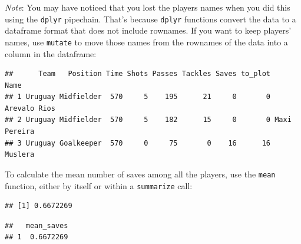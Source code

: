 \documentclass[]{book}
\makeatletter
\newenvironment{Shaded}{\begin{snugshade}}{\end{snugshade}}
\newcommand{\KeywordTok}[1]{\textcolor[rgb]{0.13,0.29,0.53}{\textbf{{#1}}}}
\newcommand{\DataTypeTok}[1]{\textcolor[rgb]{0.13,0.29,0.53}{{#1}}}
\newcommand{\StringTok}[1]{\textcolor[rgb]{0.31,0.60,0.02}{{#1}}}
\newcommand{\NormalTok}[1]{{#1}}
\newenvironment{kframe}{%
\medskip{}
\setlength{\fboxsep}{.8em}
 \def\at@end@of@kframe{}%
 \ifinner\ifhmode%
  \def\at@end@of@kframe{\end{minipage}}%
  \begin{minipage}{\columnwidth}%
 \fi\fi%
 \def\FrameCommand##1{\hskip\@totalleftmargin \hskip-\fboxsep
 \colorbox{shadecolor}{##1}\hskip-\fboxsep
     \hskip-\linewidth \hskip-\@totalleftmargin \hskip\columnwidth}%
 \MakeFramed {\advance\hsize-\width
   \@totalleftmargin\z@ \linewidth\hsize
   \@setminipage}}%
 {\par\unskip\endMakeFramed%
 \at@end@of@kframe}
\renewenvironment{Shaded}{\begin{kframe}}{\end{kframe}}
\makeatother
\begin{document}
\emph{Note}: You may have noticed that you lost the players names when
you did this using the \texttt{dplyr} pipechain. That's because
\texttt{dplyr} functions convert the data to a dataframe format that
does not include rownames. If you want to keep players' names, use
\texttt{mutate} to move those names from the rownames of the data into a
column in the dataframe:

\begin{Shaded}
\end{Shaded}

\begin{verbatim}
##      Team   Position Time Shots Passes Tackles Saves to_plot         Name
## 1 Uruguay Midfielder  570     5    195      21     0       0 Arevalo Rios
## 2 Uruguay Midfielder  570     5    182      15     0       0 Maxi Pereira
## 3 Uruguay Goalkeeper  570     0     75       0    16      16      Muslera
\end{verbatim}

To calculate the mean number of saves among all the players, use the
\texttt{mean} function, either by itself or within a \texttt{summarize}
call:

\begin{Shaded}
\end{Shaded}

\begin{verbatim}
## [1] 0.6672269
\end{verbatim}

\begin{Shaded}
\end{Shaded}

\begin{verbatim}
##   mean_saves
## 1  0.6672269
\end{verbatim}
\end{document}
